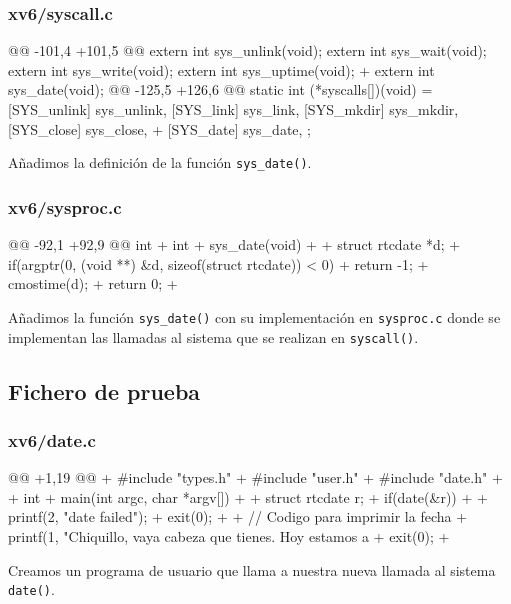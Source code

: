 \subsubsection{xv6/syscall.c}
\begin{listing}
@@ -101,4 +101,5 @@
    extern int sys_unlink(void);
    extern int sys_wait(void);
    extern int sys_write(void);
    extern int sys_uptime(void);
+   extern int sys_date(void);
@@ -125,5 +126,6 @@ static int (*syscalls[])(void) = {
    [SYS_unlink]  sys_unlink,
    [SYS_link]    sys_link,
    [SYS_mkdir]   sys_mkdir,
    [SYS_close]   sys_close,
+   [SYS_date]    sys_date,
    };
\end{listing}
\par Añadimos la definición de la función \texttt{sys\_date()}.

\subsubsection{xv6/sysproc.c}
\begin{listing}
@@ -92,1 +92,9 @@ int
+   int
+   sys_date(void)
+   {
+       struct rtcdate *d;
+       if(argptr(0, (void **) &d, sizeof(struct rtcdate)) < 0)
+           return -1;
+       cmostime(d);
+       return 0;
+   }
\end{listing}
\par Añadimos la función \texttt{sys\_date()} con su implementación en \texttt{sysproc.c}
donde se implementan las llamadas al sistema que se realizan en \texttt{syscall()}.

\subsection{Fichero de prueba}
\subsubsection{xv6/date.c}
\begin{listing}
@@ +1,19 @@
+   #include "types.h"
+   #include "user.h"
+   #include "date.h"
+
+   int 
+   main(int argc, char *argv[])
+   {
+       struct rtcdate r;
+       if(date(&r))
+       {
+           printf(2, "date failed\n");
+           exit(0);
+       }
+       // Codigo para imprimir la fecha
+       printf(1, "Chiquillo, vaya cabeza que tienes. Hoy estamos a %
+       exit(0);
+   }
\end{listing}
\par Creamos un programa de usuario que llama a nuestra nueva llamada al sistema \texttt{date()}.


